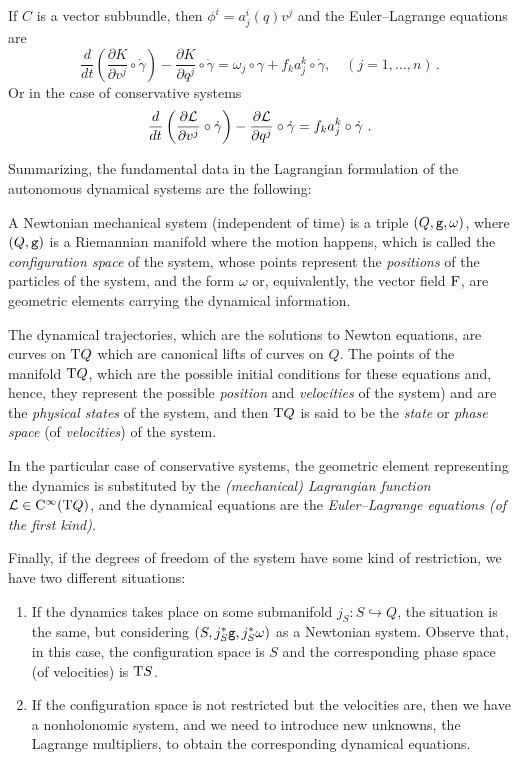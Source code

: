\documentclass[12pt]{report}
\def\derpar#1#2{\frac{\partial{#1}}{\partial{#2}}}
\def\Lag{{\cal L}}
\def\Tan{{\rm T}}
\def\Cinfty{{\rm C}^\infty}
\begin{document}
If $C$ is a vector subbundle, then  $\phi^i=a^{i}_{j}(q)v^{j}$ and the Euler--Lagrange equations are
$$
\frac{d}{d t}\left(\derpar{K}{v^j}\circ\dot\gamma\right)-
\derpar{K}{q^j}\circ\dot\gamma=
\omega_j\circ\gamma +f_ka^k_j\circ\dot\gamma
,\quad (j=1,\ldots ,n)\, .
$$
Or in the case of conservative systems
$$
\frac{d}{d t}\left(\derpar{\Lag }{v^j}\circ\dot\gamma\right)-
\derpar{\Lag}{q^j}\circ\dot\gamma=
f_ka^k_j\circ\dot\gamma \ .
$$

\vspace{0,5cm}

Summarizing, the fundamental data in the Lagrangian formulation
of the autonomous dynamical systems are the following:

A Newtonian mechanical system (independent of time) is a  triple $(Q,{\tt g},\omega )$, where
$(Q,{\tt g})$ is a Riemannian manifold where the motion happens,
which is called the {\sl configuration space} of the system,
whose points represent the {\sl positions} of the particles of the system,
and
the form $\omega$ or, equivalently, the vector field ${\rm F}$,
are geometric elements carrying the dynamical information.

The dynamical trajectories, which are the solutions to Newton equations, 
are curves on $\Tan Q$ which are canonical lifts of curves on $Q$.
The points of the manifold $\Tan Q$,
which are the possible initial conditions for these equations 
and, hence, they represent  the possible {\sl position} and {\sl velocities}
of the system) and are the {\sl physical states} of the  system, and
then $\Tan Q$ is said to be the
 {\sl state} or {\sl phase space} (of {\sl velocities\/}) of the system.

In the particular case of conservative systems,
the geometric element representing the dynamics is substituted
by the  {\sl (mechanical) Lagrangian function}
$\Lag\in\Cinfty (\Tan Q)$, and  the dynamical equations
are  the {\sl Euler--Lagrange equations (of the first kind)}.

Finally, if  the degrees of freedom of the system
have some kind of restriction, we have two different situations: 
\begin{enumerate}
\item If the dynamics takes place on some submanifold
$j_S\colon S\hookrightarrow Q$, the situation is the same, but considering
$(S,j_S^*{\tt g},j_S^*\omega)$  as a Newtonian system.
Observe that, in this case, the configuration space is $S$
and the corresponding phase space (of velocities) is $\Tan S$.
\item If the configuration space is not restricted but the velocities are, then we have a nonholonomic system, and we need to introduce new unknowns, the Lagrange multipliers, to obtain the corresponding dynamical equations. 
\end{enumerate}
\end{document}
